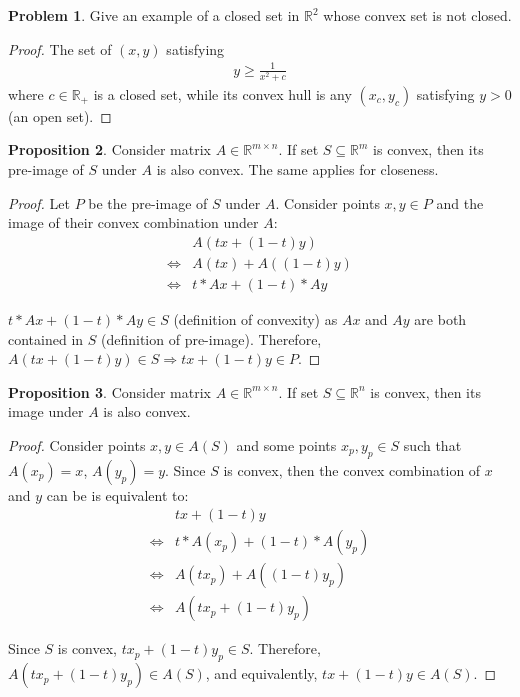 \documentclass[12pt]{article}
\newcommand{\RR}{\mathbb{R}}
\theoremstyle{definition}
\newtheorem{prop}{Proposition}[section]
\newtheorem{prob}[prop]{Problem}
\begin{document}
	\begin{prob}
		Give an example of a closed set in $\RR^2$ whose convex set is not closed.
	\end{prob}
	
	\begin{proof}
		The set of $(x, y)$ satisfying
		\begin{gather*}
			y \geq \frac{1}{x^2 + c}
		\end{gather*}
		where $c \in \RR_+$ is a closed set, while its convex hull is any $(x_c, y_c)$ satisfying $y > 0$ (an open set).
	\end{proof}
	
	\begin{prop}
		Consider matrix $A \in \RR^{m \times n}$. If set $S \subseteq \RR^m$ is convex, then its pre-image of $S$ under $A$ is also convex. The same applies for closeness.
	\end{prop}
	
	\begin{proof}
		Let $P$ be the pre-image of $S$ under $A$. Consider points $x, y \in P$ and the image of their convex combination under $A$:
		\begin{align*}
			&A(tx + (1 - t)y) \\
			\iff &A(tx) + A((1 - t)y) \\
			\iff &t*Ax + (1-t) * Ay
		\end{align*}
		
		$t*Ax + (1-t) * Ay \in S$ (definition of convexity) as $Ax$ and $Ay$ are both contained in $S$ (definition of pre-image). Therefore, $A(tx + (1 - t)y) \in S \Rightarrow tx + (1 - t)y \in P$.
	\end{proof}
	
	\begin{prop}
		Consider matrix $A \in \RR^{m \times n}$. If set $S \subseteq \RR^n$ is convex, then its image under $A$ is also convex.
	\end{prop}
	
	\begin{proof}
		Consider points $x, y \in A(S)$ and some points $x_p, y_p \in S$ such that $A(x_p) = x$, $A(y_p) = y$. Since $S$ is convex, then the convex combination of $x$ and $y$ can be is equivalent to:
		\begin{align*}
			&tx + (1 - t)y \\
			\iff &t * A(x_p) + (1 - t) * A(y_p) \\
			\iff &A(tx_p) + A((1 - t)y_p) \\
			\iff &A(tx_p + (1 - t)y_p)
		\end{align*}
		
		Since $S$ is convex, $tx_p + (1 - t)y_p \in S$. Therefore, $A(tx_p + (1 - t)y_p) \in A(S)$, and equivalently, $tx + (1 - t)y \in A(S)$.
	\end{proof}
	
\end{document}
